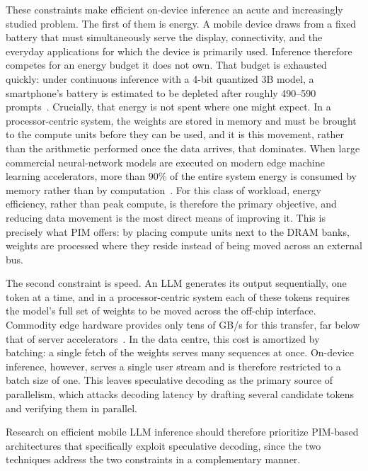 \documentclass[11pt]{article}
\begin{document}
These constraints make efficient on-device inference an acute and increasingly studied problem. The first of them is energy. A mobile device draws from a fixed battery that must simultaneously serve the display, connectivity, and the everyday applications for which the device is primarily used. Inference therefore competes for an energy budget it does not own. That budget is exhausted quickly: under continuous inference with a 4-bit quantized 3B model, a smartphone's battery is estimated to be depleted after roughly 490--590 prompts~\cite{laskaridis2024melting}. Crucially, that energy is not spent where one might expect. In a processor-centric system, the weights are stored in memory and must be brought to the compute units before they can be used, and it is this movement, rather than the arithmetic performed once the data arrives, that dominates. When large commercial neural-network models are executed on modern edge machine learning accelerators, more than 90\% of the entire system energy is consumed by memory rather than by computation~\cite{mutlu2022primer}. For this class of workload, energy efficiency, rather than peak compute, is therefore the primary objective, and reducing data movement is the most direct means of improving it. This is precisely what PIM offers: by placing compute units next to the DRAM banks, weights are processed where they reside instead of being moved across an external bus.

The second constraint is speed. An LLM generates its output sequentially, one token at a time, and in a processor-centric system each of these tokens requires the model's full set of weights to be moved across the off-chip interface. Commodity edge hardware provides only tens of GB/s for this transfer, far below that of server accelerators~\cite{chen2025elib}. In the data centre, this cost is amortized by batching: a single fetch of the weights serves many sequences at once. On-device inference, however, serves a single user stream and is therefore restricted to a batch size of one. This leaves speculative decoding as the primary source of parallelism, which attacks decoding latency by drafting several candidate tokens and verifying them in parallel.

Research on efficient mobile LLM inference should therefore prioritize PIM-based architectures that specifically exploit speculative decoding, since the two techniques address the two constraints in a complementary manner.
\end{document}

